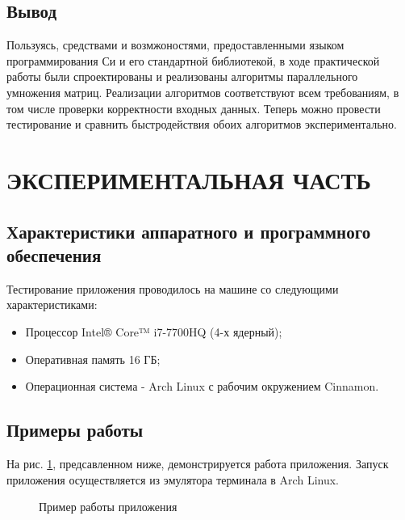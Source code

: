 \documentclass[a4paper,12pt]{article}
\begin{document}
\newpage
\subsection{Вывод}
Пользуясь, средствами и возмжоностями, предоставленными языком программирования Си и его стандартной библиотекой, в ходе практической работы были спроектированы и реализованы алгоритмы параллельного умножения матриц. Реализации алгоритмов соответствуют всем требованиям, в том числе проверки корректности входных данных. Теперь можно провести тестирование и сравнить быстродействия обоих алгоритмов экспериментально.

\newpage
\section{ЭКСПЕРИМЕНТАЛЬНАЯ ЧАСТЬ}
\subsection{Характеристики аппаратного и программного обеспечения}
Тестирование приложения проводилось на машине со следующими характеристиками:\\
\begin{itemize}
\item Процессор Intel® Core™ i7-7700HQ (4-х ядерный);
\item Оперативная память 16 ГБ;
\item Операционная система - Arch Linux с рабочим окружением Cinnamon.
\end{itemize}

\newpage
\subsection{Примеры работы}
На рис. \ref{images:example}, предсавленном ниже, демонстрируется работа приложения. Запуск приложения осуществляется из эмулятора терминала в Arch Linux.
\begin{figure}[h]
\caption{Пример работы приложения}
\label{images:example}
\end{figure}
\end{document}
